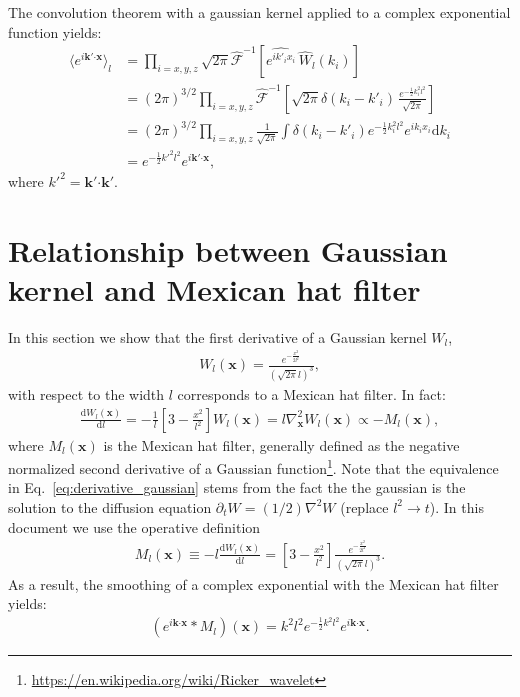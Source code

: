 \documentclass[]{article}
\newcommand{\bcdot}{\bm{\cdot}}
\begin{document}
The convolution theorem with a gaussian kernel applied to a complex exponential function yields:
%
\begin{align}
	\langle e^{i \bm k' \bcdot\bm x} \rangle_l &= \prod_{i=x,y,z} \sqrt{2 \pi} \hat{\mathcal{F}}^{-1} \left[ \widehat{e^{i k'_i x_i}} \, \hat{W}_l (k_i) \right] \nonumber \\ & = (2 \pi)^{3/2} \prod_{i=x,y,z} \hat{\mathcal{F}}^{-1} \left[ \sqrt{2\pi} \delta \left( k_i - k'_i \right) \, \frac{e^{-\frac{1}{2} k_i^2 l ^2}}{\sqrt{2 \pi } } \right] \nonumber \\
	&= (2 \pi)^{3/2} \prod_{i=x,y,z} \frac{1}{\sqrt{2 \pi}} \int \delta \left( k_i - k'_i \right) e^{-\frac{1}{2} k_i^2 l ^2} e^{i k_i x_i} \mathrm{d} k_i \nonumber \\
	&= e^{-\frac{1}{2} k'^2 l^2} e^{i \bm k' \bcdot\bm x} ,
\end{align}
%
where $k'^2 = \bm k' \bcdot \bm k'$.

\section{Relationship between Gaussian kernel and Mexican hat filter}\label{app:gaussian_mexican}

In this section we show that the first derivative of a Gaussian kernel $W_l$,
%
\begin{align}
	W_l (\bm x) = \frac{e^{-\frac{x^2}{2 l ^2}}}{(\sqrt{2 \pi } l )^3},
\end{align}
%
with respect to the width $l$ corresponds to a Mexican hat filter. In fact:
%
\begin{align}\label{eq:derivative_gaussian}
	\frac{\mathrm{d} W_l (\bm x)}{\mathrm{d} l} = - \frac{1}{l}\left[3 - \frac{x^2}{l^2} \right]  W_l (\bm x) = l \nabla^2_{\bm x} W_l (\bm x) \propto - M_l (\bm x),
\end{align}
%
where $M_l (\bm x)$ is the Mexican hat filter, generally defined as the negative normalized second derivative of a Gaussian function\footnote{\url{https://en.wikipedia.org/wiki/Ricker_wavelet}}. Note that the equivalence in Eq.~\eqref{eq:derivative_gaussian} stems from the fact the the gaussian is the solution to the diffusion equation $\partial_t W = (1/2) \nabla^2 W$ (replace $l^2 \rightarrow t$). In this document we use the operative definition
%
\begin{align}
	M_l (\bm x) \equiv - l \frac{\mathrm{d} W_l (\bm x)}{\mathrm{d} l} = \left[3 - \frac{x^2}{l^2} \right]  \frac{e^{-\frac{x^2}{2 l ^2}}}{(\sqrt{2 \pi } l )^3} .
\end{align}
%
As a result, the smoothing of a complex exponential with the Mexican hat filter yields:
%
\begin{align}\label{eq:mex_smoothing_Fourier}
	( e^{i \bm k \bcdot\bm x} * M_l) (\bm x) = k^2 l^2 e^{-\frac{1}{2} k^2 l^2} e^{i \bm k \bcdot\bm x}.
\end{align}
\end{document}
